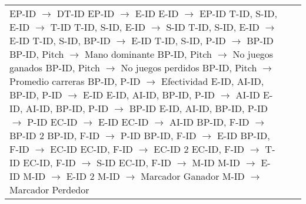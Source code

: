 \documentclass{report}
\begin{document}
\begin{tabularx}{\textwidth}{|X|X|X|}
        EP-ID $\rightarrow$ DT-ID \newline 
        EP-ID $\rightarrow$ E-ID \newline 
        E-ID $\rightarrow$ EP-ID \newline 
        T-ID, S-ID, E-ID $\rightarrow$ T-ID \newline 
        T-ID, S-ID, E-ID $\rightarrow$ S-ID \newline 
        T-ID, S-ID, E-ID $\rightarrow$ E-ID \newline 
        T-ID, S-ID, BP-ID $\rightarrow$ E-ID \newline 
        T-ID, S-ID, P-ID $\rightarrow$ BP-ID \newline 
        BP-ID, Pitch $\rightarrow$ Mano dominante \newline 
        BP-ID, Pitch $\rightarrow$ No juegos ganados \newline 
        BP-ID, Pitch $\rightarrow$ No juegos perdidos \newline 
        BP-ID, Pitch $\rightarrow$ Promedio carreras \newline 
        BP-ID, P-ID $\rightarrow$ Efectividad \newline 
        E-ID, AI-ID, BP-ID, P-ID $\rightarrow$ E-ID \newline 
        E-ID, AI-ID, BP-ID, P-ID $\rightarrow$ AI-ID \newline 
        E-ID, AI-ID, BP-ID, P-ID $\rightarrow$ BP-ID \newline 
        E-ID, AI-ID, BP-ID, P-ID $\rightarrow$ P-ID \newline 
        EC-ID $\rightarrow$ E-ID \newline 
        EC-ID $\rightarrow$ AI-ID \newline 
        BP-ID, F-ID $\rightarrow$ BP-ID 2 \newline 
        BP-ID, F-ID $\rightarrow$ P-ID \newline 
        BP-ID, F-ID $\rightarrow$ E-ID \newline 
        BP-ID, F-ID $\rightarrow$ EC-ID \newline 
        EC-ID, F-ID $\rightarrow$ EC-ID 2 \newline 
        EC-ID, F-ID $\rightarrow$ T-ID \newline 
        EC-ID, F-ID $\rightarrow$ S-ID \newline
        EC-ID, F-ID $\rightarrow$ M-ID \newline 
        M-ID $\rightarrow$ E-ID \newline 
        M-ID $\rightarrow$ E-ID 2 \newline 
        M-ID $\rightarrow$ Marcador Ganador \newline 
        M-ID $\rightarrow$ Marcador Perdedor & 


\end{tabularx}
\end{document}
